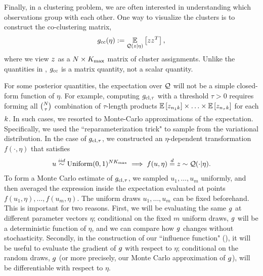 \begin{ex}[Co-clustering]

Finally, in a clustering problem, we are often interested in understanding
which observations group with each other.
One way to visualize the clusters is to construct the co-clustering matrix,
\begin{align*}
g_{\text{cc}}(\eta) := \underset{\mathcal{Q}(z\vert\eta)}{\mathbb{E}}\left[zz^{T}\right],
\end{align*}
where we view $z$ as a $N\times {K_{\mathrm{max}}}$ matrix of cluster assignments.
Unlike the quantities in ,
$g_{\text{cc}}$ is a matrix quantity, not a scalar quantity.

\end{ex}

For some posterior quantities, the expectation over $\mathcal{Q}$ will not be a simple
closed-form function of $\eta$.
For example, computing $g_{\text{cl},\tau}$ with a threshold $\tau > 0$
requires forming all ${N\choose\tau}$ combination of $\tau$-length products
$\underset{}{\mathbb{E}}\left[z_{n_1k}\right]\times \ldots \times \underset{}{\mathbb{E}}\left[z_{n_\tau k}\right]$
for each $k$.
In such cases, we resorted to Monte-Carlo approximations of the expectation.
Specifically, we used the ``reparameterization trick"
to sample from the variational distribution.
In the case of $g_{\text{cl},\tau}$,
we constructed an $\eta$-dependent transformation
$f(\cdot, \eta)$ that satisfies
\begin{align*}
  u \overset{iid}{\sim}\text{Uniform}(0, 1)^{N{K_{\mathrm{max}}}} \implies
  f(u, \eta) \stackrel{d}{=} z \sim \mathcal{Q}(\cdot | \eta).
\end{align*}
To form a Monte Carlo estimate of $g_{\text{cl},\tau}$,
we sampled $u_1, \dots, u_m$ uniformly,
and then averaged the expression inside the expectation evaluated at points
$f(u_1, \eta), \ldots, f(u_m, \eta)$.
The uniform draws $u_1, \dots, u_m$ can be fixed beforehand.
This is important for two reasons.
First, we will be evaluating the same $g$ at different parameter vectors $\eta$;
conditional on the fixed $m$ uniform draws, $g$ will be a deterministic function
of $\eta$, and we can compare how $g$ changes without stochasticity.
Secondly, in the construction of our ``influence function" (),
it will be useful to evaluate the
gradient of $g$ with respect to $\eta$; conditional on the random draws,
$g$ (or more precisely, our Monte Carlo approximation of $g$), will be
differentiable with respect to $\eta$.

